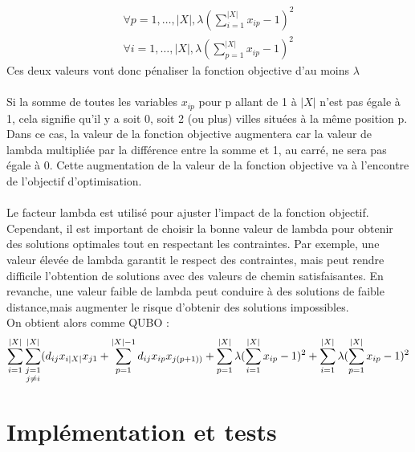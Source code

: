 \documentclass{article}
\begin{document}
        \begin{equation*}
            \begin{aligned}
                \forall p=1,\dots,|X|, \lambda(\sum_{i=1}^{|X|}x_{ip}-1)^{2}\\
                \forall i=1,\dots,|X| , \lambda(\sum_{p=1}^{|X|}x_{ip}-1)^{2}
            \end{aligned}
        \end{equation*}
        Ces deux valeurs vont donc pénaliser la fonction objective d'au moins $\lambda$\\\\
        Si la somme de toutes les variables $x_{ip}$ pour p allant de 1 à $|X|$ n'est pas égale à 1, cela signifie qu'il y a soit 0, soit 2 (ou plus) villes situées à la même position p. Dans ce cas, la valeur de la fonction objective augmentera car la valeur de lambda multipliée par la différence entre la somme et 1, au carré, ne sera pas égale à 0. Cette augmentation de la valeur de la fonction objective va à l'encontre de l'objectif d'optimisation.	\\\\
        Le facteur lambda est utilisé pour ajuster l'impact de la fonction objectif. Cependant, il est important de choisir la bonne valeur de lambda pour obtenir des solutions optimales tout en respectant les contraintes. Par exemple, une valeur élevée de lambda garantit le respect des contraintes, mais peut rendre difficile l'obtention de solutions avec des valeurs de chemin satisfaisantes. En revanche, une valeur faible de lambda peut conduire à des solutions de faible distance,mais augmenter le risque d'obtenir des solutions impossibles.\\
        On obtient alors comme QUBO :
        \begin{equation*}
            \sum_{i=1}^{|X|}\sum_{\substack{j=1 \\ j\neq i }}^{|X|}(d_{ij}x_{i|X|}x_{j1}+\sum_{p=1}^{|X|-1}d_{ij}x_{ip}x_{j(p+1))}\\ +\sum_{p=1}^{|X|}\lambda(\sum_{i=1}^{|X|}x_{ip} -1)^{2}+ \sum_{i=1}^{|X|}\lambda(\sum_{p=1}^{|X|}x_{ip} -1)^{2}
        \end{equation*}

        \section{Implémentation et tests}\label{sec:implementation-et-tests}
\end{document}
